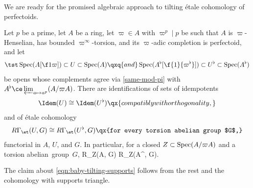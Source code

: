 We are ready for the promised algebraic approach to tilting \'{e}tale cohomology of perfectoids.

\bthm \label{baby-tilting}
Let $p$ be a prime, let $A$ be a ring, let $\varpi \in A$ with $\varpi^p \mid p$ be such that $A$ is $\varpi$-Henselian, has bounded $\varpi^\infty$-torsion, and its $\varpi$-adic completion is perfectoid, and let
\[
\tst \Spec(A[\f 1\varpi]) \subset U \subset \Spec(A) \qxq{and} \Spec(A^\flat[\f{1}{\varpi^\flat}]) \subset U^\flat \subset \Spec(A^\flat)
\]
be opens  whose complements agree via \eqref{same-mod-pi} with $A^\flat \ce \varprojlim_{a \mapsto a^p} (A/\varpi A)$. There are identifications of sets of idempotents
\[
\Idem(U) \cong \Idem(U^\flat) \qx{compatibly with orthogonality,}
\]
and of \'{e}tale cohomology
\[
R\Gamma_\et(U, G) \cong R\Gamma_\et(U^\flat, G) \qx{for every torsion abelian group $G$,}
\]
functorial in $A$, $U$, and $G$. In particular, for a closed $Z \subset \operatorname{Spec}(A/\varpi A)$ and a torsion abelian~group~$G$,
\be \label{eqn:baby-tilting-supports}
R\Gamma_Z(A, G) \cong R\Gamma_Z(A^\flat, G).
\ee
\ethm

\bpf
The claim about \eqref{eqn:baby-tilting-supports} follows from the rest and the cohomology with supports triangle.

